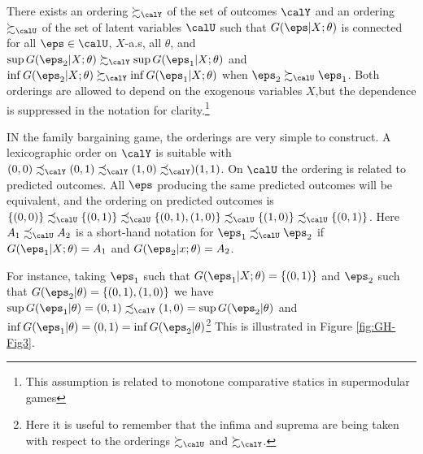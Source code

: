 \begin{assumption}[Monotonicity]
	\label{assm:GH-2}
	There exists an ordering $\succsim_\calY$ of the set of outcomes $\calY$ and an ordering $\succsim_\calU$ of the set of latent variables $\calU$ such that $G(\eps|X;\theta)$ is connected for all $\eps\in\calU$, $X$-a.s, all $\theta$, and $\sup G(\eps_2|X;\theta) \succsim_\calY\sup G(\eps_1|X;\theta)$ and $\inf G(\eps_2|X;\theta) \succsim_\calY \inf G(\eps_1|X;\theta)$ when $\eps_2\succsim_\calU \eps_1$. Both orderings are allowed to depend on the exogenous variables $X$,but the dependence is suppressed in the notation for clarity.\footnote{ This assumption is related to monotone comparative statics in supermodular games}
\end{assumption}
\begin{example*}
	IN the family bargaining game, the orderings are very simple to construct. A lexicographic order on $\calY$ is suitable with $(0,0)\precsim_\calY (0,1)\precsim_{\calY} (1,0) \precsim_{\calY})(1,1)$. On $\calU$ the ordering is related to predicted outcomes. All $\eps$ producing the same predicted outcomes will be equivalent, and the ordering on predicted outcomes is $\{(0,0)\}\precsim_\calU \{(0,1)\} \precsim_\calU \{(0,1),(1,0)\}\precsim_\calU \{(1,0)\}\precsim_\calU \{(0,1)\}$. Here $A_1 \precsim_\calU A_2$ is a short-hand notation for $\eps_1 \precsim_\calU \eps_2$ if $G(\eps_1|X;\theta) = A_1$ and $G(\eps_2 | x;\theta) = A_2$.

	For instance, taking $\eps_1$ such that $G(\eps_1 | X;\theta) = \{(0,1)\}$ and $\eps_2$ such that $G(\eps_2|\theta) = \{(0,1),(1,0)\}$ we have $\sup G(\eps_1|\theta) = (0,1) \precsim_{\calY} (1,0) = \sup G(\eps_2 | \theta)$ and $\inf G(\eps_1 | \theta) = (0,1) = \inf G(\eps_2 |\theta)$\footnote{Here it is useful to remember that the infima and suprema are being taken with respect to the orderings $\succsim_\calU$ and $\succsim_\calY$.} This is illustrated in Figure \ref{fig:GH-Fig3}.
\end{example*}

